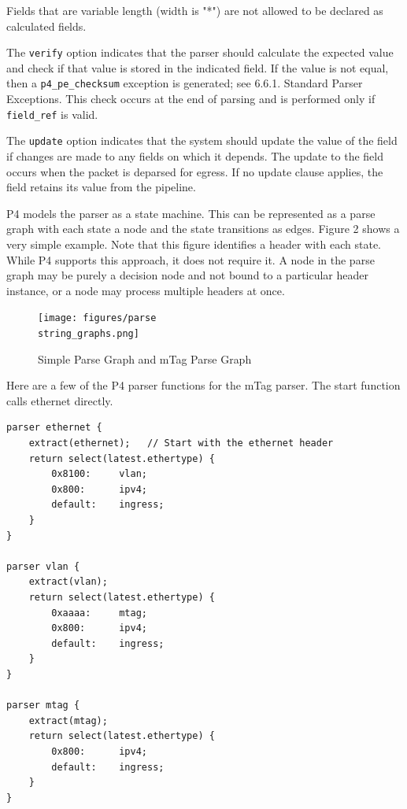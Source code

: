 \documentclass[12pt]{article}
\begin{document}
Fields that are variable length (width is "*") are not allowed to be declared 
as calculated fields.

The \texttt{verify} option indicates that the parser should calculate the expected 
value and check if that value is stored in the indicated field. If the value 
is not equal, then a \texttt{p4_pe_checksum} exception is generated; see 6.6.1. 
Standard Parser Exceptions. This check occurs at the end of parsing and is 
performed only if \texttt{field_ref} is valid.

The \texttt{update} option indicates that the system should update the value of the 
field if changes are made to any fields on which it depends. The update to 
the field occurs when the packet is deparsed for egress. If no update clause 
applies, the field retains its value from the \matchaction pipeline.


P4 models the parser as a state machine. This can be represented as a parse 
graph with each state a node and the state transitions as edges. Figure 2 
shows a very simple example. Note that this figure identifies a header with 
each state. While P4 supports this approach, it does not require it. A node 
in the parse graph may be purely a decision node and not bound to a particular 
header instance, or a node may process multiple headers at once.



\begin{figure}[h!]
    \centering
    \texttt{[image: figures/parse\\string\_graphs.png]}
    \caption{Simple Parse Graph and mTag Parse Graph}
    \label{fig:parsegraphs}
\end{figure}


Here are a few of the P4 parser functions for the mTag parser. The 
start function calls ethernet directly.

\begin{lstlisting}[keywords={},frame=single,escapechar=\@]
parser ethernet {
    extract(ethernet);   // Start with the ethernet header
    return select(latest.ethertype) {
        0x8100:     vlan;
        0x800:      ipv4;
        default:    ingress;
    }
}

parser vlan {
    extract(vlan);
    return select(latest.ethertype) {
        0xaaaa:     mtag;
        0x800:      ipv4;
        default:    ingress;
    }
}

parser mtag {
    extract(mtag);
    return select(latest.ethertype) {
        0x800:      ipv4;
        default:    ingress;
    }
}
\end{lstlisting}
\end{document}
